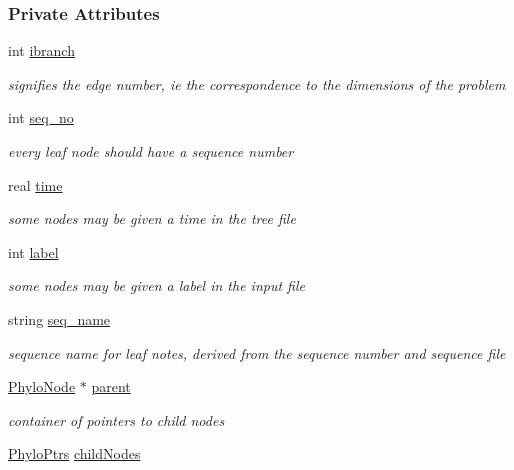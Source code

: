 \subsubsection*{\-Private \-Attributes}
\begin{DoxyCompactItemize}
\item 
int \hyperlink{classPhyloNode_a08d47840fd629726502a4c83ee7f97d0}{ibranch}
\begin{DoxyCompactList}\small\item\em signifies the edge number, ie the correspondence to the dimensions of the problem \end{DoxyCompactList}\item 
int \hyperlink{classPhyloNode_ac50e08220f3cfb519d0e21ae4dd53dd2}{seq\-\_\-no}
\begin{DoxyCompactList}\small\item\em every leaf node should have a sequence number \end{DoxyCompactList}\item 
real \hyperlink{classPhyloNode_a24cf3f05065a31fde05a428d0eca87cf}{time}
\begin{DoxyCompactList}\small\item\em some nodes may be given a time in the tree file \end{DoxyCompactList}\item 
int \hyperlink{classPhyloNode_a4abacdd01e6c36193c6372758a05debf}{label}
\begin{DoxyCompactList}\small\item\em some nodes may be given a label in the input file \end{DoxyCompactList}\item 
string \hyperlink{classPhyloNode_aa99afd949e72b932d9c0d89d06c2a890}{seq\-\_\-name}
\begin{DoxyCompactList}\small\item\em sequence name for leaf notes, derived from the sequence number and sequence file \end{DoxyCompactList}\item 
\hyperlink{classPhyloNode}{\-Phylo\-Node} $\ast$ \hyperlink{classPhyloNode_a3625b4a3634e7662fdb063b14ce21482}{parent}
\begin{DoxyCompactList}\small\item\em container of pointers to child nodes \end{DoxyCompactList}\item 
\hyperlink{PhyloTree_8hpp_a949af9a126c7f41a99746ced5d664690}{\-Phylo\-Ptrs} \hyperlink{classPhyloNode_ae90d7dd10164a001107371397dc036be}{child\-Nodes}
\end{DoxyCompactItemize}


